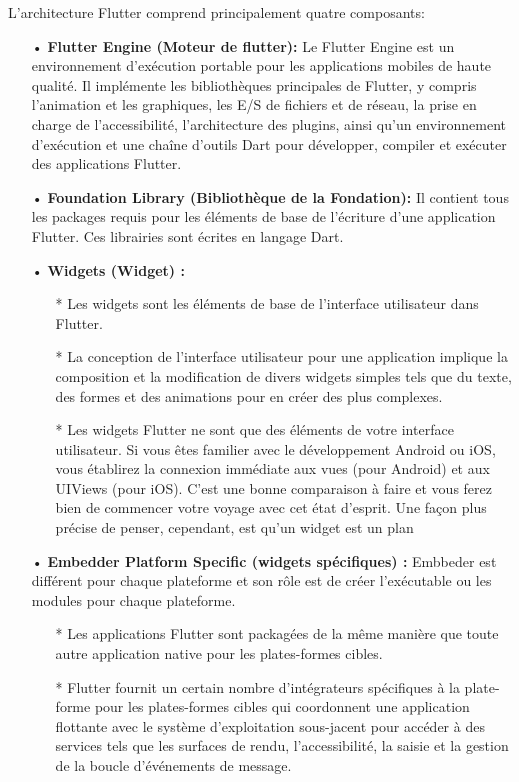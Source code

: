 	
	 L’architecture Flutter comprend principalement quatre composants:
	\begin{enumerate}
		\item[•] \textbf{Flutter Engine (Moteur de flutter): }
		Le Flutter Engine est un environnement d’exécution portable pour les applications mobiles de haute qualité. Il implémente les bibliothèques principales de Flutter, y compris l’animation et les graphiques, les E/S de fichiers et de réseau, la prise en charge de l’accessibilité, l’architecture des plugins, ainsi qu’un environnement d’exécution et une chaîne d’outils Dart pour développer, compiler et exécuter des applications Flutter.
		\item[•] \textbf{Foundation Library (Bibliothèque de la Fondation):} Il contient tous les packages requis pour les éléments de base de l’écriture d’une application Flutter. Ces librairies sont écrites en langage Dart.
		\item[•] \textbf{Widgets (Widget) :}
		\begin{enumerate}
			\item[*] Les widgets sont les éléments de base de l’interface utilisateur dans Flutter.
			\item[*] La conception de l’interface utilisateur pour une application implique la composition et la modification de divers widgets simples tels que du texte, des formes et des animations pour en créer des plus complexes.
			\item[*] Les widgets Flutter ne sont que des éléments de votre interface utilisateur. Si vous êtes familier avec le développement Android ou iOS, vous établirez la connexion immédiate aux vues (pour Android) et aux UIViews (pour iOS). C’est une bonne comparaison à faire et vous ferez bien de commencer votre voyage avec cet état d’esprit. Une façon plus précise de penser, cependant, est qu’un widget est un plan
		\end{enumerate}	
		\item[•] \textbf{Embedder Platform Specific (widgets spécifiques) :}
		Embbeder est différent pour chaque plateforme et son rôle est de créer l’exécutable ou les modules pour chaque plateforme.
		\begin{enumerate}
			\item[*] Les applications Flutter sont packagées de la même manière que toute autre application native pour les plates-formes cibles.
			\item[*] Flutter fournit un certain nombre d’intégrateurs spécifiques à la plate-forme pour les plates-formes cibles qui coordonnent une application flottante avec le système d’exploitation sous-jacent pour accéder à des services tels que les surfaces de rendu, l’accessibilité, la saisie et la gestion de la boucle d’événements de message.

\end{enumerate}
\end{enumerate}
